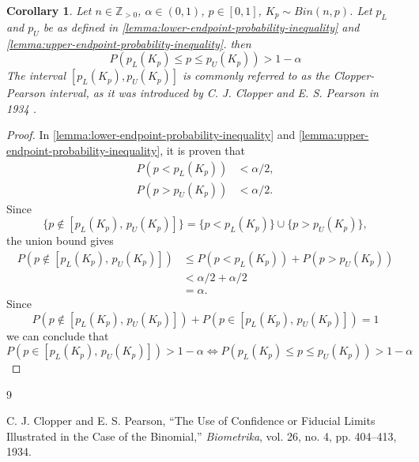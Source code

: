 \documentclass{article}
\newtheorem{corollary}[lemma]{Corollary}
\begin{document}
\begin{corollary}\label{lemma:clopper-pearson-interval}
    Let $n\in\mathbb{Z}_{>0}$, $\alpha\in(0,1)$, $p\in[0,1]$, $K_p\sim Bin(n,p)$. Let $p_L$ and $p_U$ be as defined in \autoref{lemma:lower-endpoint-probability-inequality} and \autoref{lemma:upper-endpoint-probability-inequality}.
    then 
    $$P(p_L(K_p)\leq p\leq p_U(K_p))> 1-\alpha$$
    The interval $[p_L(K_p),p_U(K_p)]$ is commonly referred to as the Clopper-Pearson interval, as it was introduced by C. J. Clopper and E. S. Pearson in 1934 \cite{clopper1934}.
    \end{corollary}
\begin{proof}
In \autoref{lemma:lower-endpoint-probability-inequality} and \autoref{lemma:upper-endpoint-probability-inequality}, it is proven that
    $$\begin{aligned}
        P(p<p_L(K_p))&<\alpha/2,\\
        P(p>p_U(K_p))&<\alpha/2.
    \end{aligned}$$
Since
$$\{p\notin[p_L(K_p),\,p_U(K_p)]\}
=
\{p<p_L(K_p)\}\cup\{p>p_U(K_p)\},$$
the union bound gives
$$\begin{aligned}
P(p\notin[p_L(K_p),\,p_U(K_p)])
&\leq P(p<p_L(K_p))+P(p>p_U(K_p))\\
&<\alpha/2+\alpha/2\\
&=\alpha.
\end{aligned}$$
Since
$$P(p\notin[p_L(K_p),\,p_U(K_p)]) + P(p\in[p_L(K_p),\,p_U(K_p)]) = 1$$
we can conclude that 
$$P\left(p\in[p_L(K_p),\,p_U(K_p)]\right)>1-\alpha \Leftrightarrow P(p_L(K_p)\leq p \leq p_U(K_p))> 1-\alpha$$
\end{proof}


\newpage
\begin{thebibliography}{9}

C. J. Clopper and E. S. Pearson,
``The Use of Confidence or Fiducial Limits Illustrated in the Case of the Binomial,''
\textit{Biometrika},
vol. 26, no. 4, pp. 404--413, 1934.

\end{thebibliography}
\end{document}
